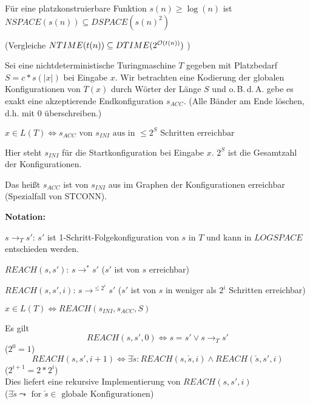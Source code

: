 \begin{satz}
    

    Für eine platzkonstruierbare Funktion $s(n) \geq \log(n)$ ist \\
    $ NSPACE(s(n)) \subseteq DSPACE(s(n)^2)$

    (Vergleiche
    $ NTIME(t(n)) \subseteq DTIME(2^{\mathcal{O}(t(n))})$
    )

\end{satz}

\begin{beweis}
    
    Sei eine nichtdeterministische Turingmaschine $T$ gegeben mit Platzbedarf $S = c * s(|x|)$ bei Eingabe $x$. Wir betrachten eine Kodierung der globalen Konfigurationen von $T(x)$ durch Wörter der Länge $S$ und o.\,B.\,d.\,A. gebe es exakt eine akzeptierende Endkonfiguration $s_{ACC}$. (Alle Bänder am Ende löschen, d.h. mit $0$ überschreiben.)

    $
    x \in L(T) 
        \Longleftrightarrow 
    s_{ACC} \text{ von } s_{INI} \text{ aus in } \leq 2^S \text{ Schritten erreichbar}
    $

    Hier steht $s_{INI}$ für die Startkonfiguration bei Eingabe $x$. $2^S$ ist die Gesamtzahl der Konfigurationen.

    Das heißt $s_{ACC}$ ist von $s_{INI}$ aus im Graphen der Konfigurationen erreichbar (Spezialfall von STCONN).

\end{beweis}


\textbf{Notation:}

$s \rightarrow_T s'$: $s'$ ist 1-Schritt-Folgekonfiguration von $s$ in $T$ und kann in $LOGSPACE$ entschieden werden.

$REACH(s, s')$: $s \rightarrow^\ast s'$ ($s'$ ist von $s$ erreichbar)

$REACH(s, s', i)$: $s \rightarrow^{\leq 2^i} s'$ ($s'$ ist von $s$ in weniger als $2^i$ Schritten erreichbar)


$ x \in L(T) \Longleftrightarrow REACH(s_{INI}, s_{ACC}, S)$

Es gilt 
$$REACH(s, s', 0) \Longleftrightarrow s = s' \lor s \rightarrow_T s'$$
\hspace{4cm}($2^0 = 1$)
$$REACH(s, s', i+1) \Longleftrightarrow \exists \check{s} : REACH(s, \check{s}, i) \land REACH(\check{s}, s', i)$$ 
\hspace{4cm}($2^{i+1} = 2 * 2^i$)\\
Dies liefert eine rekursive Implementierung von $REACH(s,s',i)$ \\
\hspace{4cm}($\exists \check{s} \leadsto \text { for } \check{s} \in \text{ globale Konfigurationen}$)


